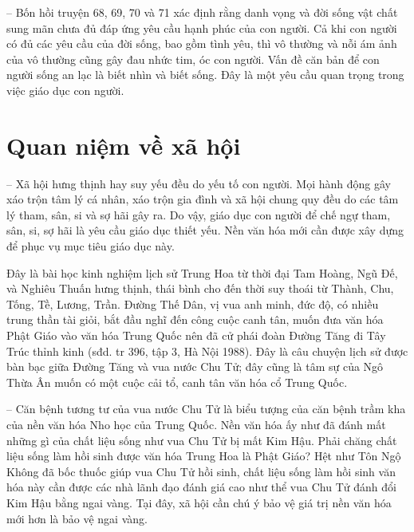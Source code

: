 -- Bốn hồi truyện 68, 69, 70 và 71 xác định rằng danh vọng và đời sống vật chất sung mãn chưa đủ đáp ứng yêu cầu hạnh phúc của con người. Cả khi con người có đủ các yêu cầu của đời sống, bao gồm tình yêu, thì vô thường và nỗi ám ảnh của vô thường cũng gây đau nhức tim, óc con người. Vấn đề căn bản để con người sống an lạc là biết nhìn và biết sống. Đây là một yêu cầu quan trọng trong việc giáo dục con người.

\section{Quan niệm về xã hội} %
\label{sec:68_69_xa_hoi}

-- Xã hội hưng thịnh hay suy yếu đều do yếu tố con người. Mọi hành động gây xáo trộn tâm lý cá nhân, xáo trộn gia đình và xã hội chung quy đều do các tâm lý tham, sân, si và sợ hãi gây ra. Do vậy, giáo dục con người để chế ngự tham, sân, si, sợ hãi là yêu cầu giáo dục thiết yếu. Nền văn hóa mới cần được xây dựng để phục vụ mục tiêu giáo dục này.

Đây là bài học kinh nghiệm lịch sử Trung Hoa từ thời đại Tam Hoàng, Ngũ Đế, và Nghiêu Thuấn hưng thịnh, thái bình cho đến thời suy thoái từ Thành, Chu, Tống, Tề, Lương, Trần. Đường Thế Dân, vị vua anh minh, đức độ, có nhiều trung thần tài giỏi, bắt đầu nghĩ đến công cuộc canh tân, muốn đưa văn hóa Phật Giáo vào văn hóa Trung Quốc nên đã cử phái đoàn Đường Tăng đi Tây Trúc thỉnh kinh (sđd. tr 396, tập 3, Hà Nội 1988). Đây là câu chuyện lịch sử được bàn bạc giữa Đường Tăng và vua nước Chu Tử; đây cũng là tâm sự của Ngô Thừa Ân muốn có một cuộc cải tổ, canh tân văn hóa cổ Trung Quốc.

-- Căn bệnh tương tư của vua nước Chu Tử là biểu tượng của căn bệnh trầm kha của nền văn hóa Nho học của Trung Quốc. Nền văn hóa ấy như đã đánh mất những gì của chất liệu sống như vua Chu Tử bị mất Kim Hậu. Phải chăng chất liệu sống làm hồi sinh được văn hóa Trung Hoa là Phật Giáo? Hệt như Tôn Ngộ Không đã bốc thuốc giúp vua Chu Tử hồi sinh, chất liệu sống làm hồi sinh văn hóa này cần được các nhà lãnh đạo đánh giá cao như thể vua Chu Tử đánh đổi Kim Hậu bằng ngai vàng. Tại đây, xã hội cần chú ý bảo vệ giá trị nền văn hóa mới hơn là bảo vệ ngai vàng.
